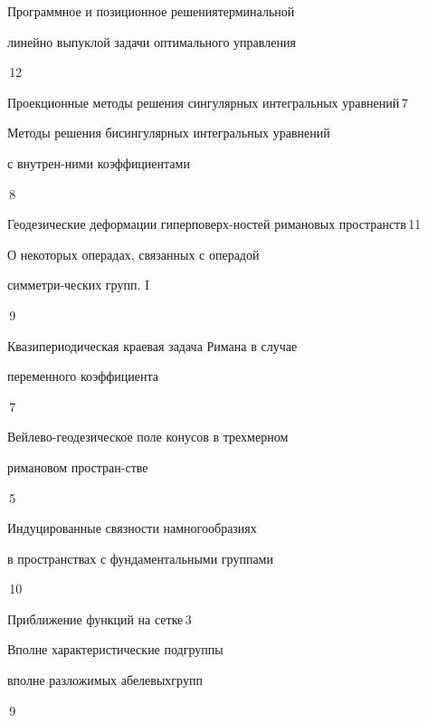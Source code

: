 

{Программное и позиционное решения\newline терминальной


линейно выпуклой задачи оптимального управления}{\No\,12}




{Проекционные методы решения сингулярных интегральных уравнений}{\No\,7}




{Методы решения бисингулярных интегральных уравнений


с внутрен-\newline ними коэффициентами}{\No\,8}




{Геодезические деформации гиперповерх-\newline ностей римановых пространств}{\No\,11}




{О некоторых операдах, связанных с операдой 


симметри-\newline ческих групп. I}{\No\,9}




{Квазипериодическая краевая задача Римана в случае\newline  


переменного коэффициента}{\No\,7}




{Вейлево-геодезическое поле конусов в трехмерном  


римановом простран-\newline стве}{\No\,5}




{Индуцированные связности на\newline многообразиях


в пространствах с фундаментальными группами}{\No\,10}




{Приближение функций на сетке}{\No\,3}




{Вполне характеристические подгруппы


вполне разложимых абелевых\newline групп}{\No\,9}








